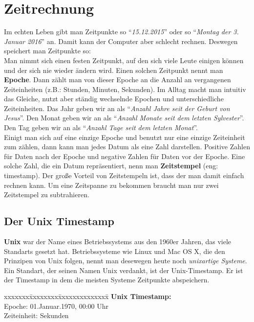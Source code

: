 \documentclass[c_worksheet.tex]{subfiles}
\begin{document}
  
\chapter{Zeitrechnung}

Im echten Leben gibt man Zeitpunkte so ``\textit{15.12.2015}'' oder so ``\textit{Montag der 3. Januar 2016}'' an.
Damit kann der Computer aber schlecht rechnen. Deswegen speichert man Zeitpunkte so:\\

Man nimmt sich einen festen Zeitpunkt, auf den sich viele Leute einigen können und der sich nie wieder ändern wird. Einen solchen Zeitpunkt nennt man \textbf{Epoche}. Dann zählt man von dieser Epoche an die Anzahl an vergangenen Zeiteinheiten (z.B.: Stunden, Minuten, Sekunden). Im Alltag macht man intuitiv das Gleiche, nutzt aber ständig wechselnde Epochen und unterschiedliche Zeiteinheiten. Das Jahr geben wir an als ``\textit{Anzahl Jahre seit der Geburt von Jesus}''. Den Monat geben wir an als ``\textit{Anzahl Monate seit dem letzten Sylvester}''. Den Tag geben wir an als ``\textit{Anzahl Tage seit dem letzten Monat}''.\\
Einigt man sich auf eine einzige Epoche und benutzt nur eine einzige Zeiteinheit zum zählen, dann kann man jedes Datum als eine Zahl darstellen. Positive Zahlen für Daten nach der Epoche und negative Zahlen für Daten vor der Epoche. Eine solche Zahl, die ein Datum repräsentiert, nenn man \textbf{Zeitstempel} (eng: timestamp). Der große Vorteil von Zeitstempeln ist, dass der man damit einfach rechnen kann. Um eine Zeitspanne zu bekommen braucht man nur zwei Zeitstempel zu subtrahieren.

\section{Der Unix Timestamp}

\textbf{Unix} war der Name eines Betriebssystems aus den 1960er Jahren, das viele Standarts gesetzt hat. Betriebssysteme wie Linux und Mac OS X, die den Prinzipen von Unix folgen, nennt man desewegen heute noch \textit{unixartige Systeme}. Ein Standart, der seinen Namen Unix verdankt, ist der Unix-Timestamp. Er ist der Timestamp in dem die meisten Systeme Zeitpunkte abspeichern.\\
\begin{tabbing}
xxxxxxx\=xxxxxxxx\=xxxxxxxxxxxxxx\= \kill
\>\textbf{Unix Timestamp:}\\
\>\>Epoche: \> 01.Januar.1970,  00:00 Uhr\\
\>\>Zeiteinheit: \>Sekunden
\end{tabbing}
\end{document}
